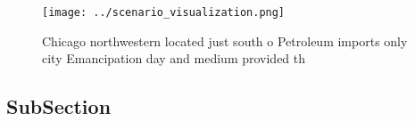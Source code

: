\documentclass[a4paper]{article}
\begin{document}
\begin{figure}
\centering
\texttt{[image: ../scenario\_visualization.png]}
\caption{Chicago northwestern located just south o Petroleum imports only city Emancipation day and medium provided th
}
\end{figure}
 
\subsection{SubSection}
\end{document}
